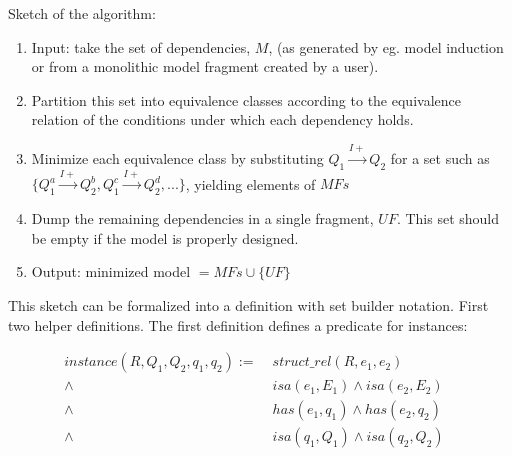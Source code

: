 \documentclass{article} %
\begin{document}
%
%

Sketch of the algorithm:

\begin{enumerate}

\item Input: take the set of dependencies, $M$, (as generated by eg. model
	induction or from a monolithic model fragment created by a user).  

\item Partition this set into equivalence classes according to the
	equivalence relation of the conditions under which each dependency
	holds.

\item Minimize each equivalence class by substituting 
	$Q_1 \overset{I+}{\rightarrow} Q_2 $ for a set such as 
	$ \{ Q_1^a \overset{I+}{\rightarrow} Q_2^b, Q_1^c \overset{I+}{\rightarrow} Q_2^d,  . . . \} $, 
	yielding elements of $MFs$

\item Dump the remaining dependencies in a single fragment, $UF$. 
	This set should be empty if the model is properly designed.

\item Output: minimized model $ = MFs \cup \{ UF \} $

\end{enumerate}

This sketch can be formalized into a definition with set builder notation.
First two helper definitions. The first definition defines a predicate for
instances:

\begin{align*}
instance(R, Q_1, Q_2, q_1, q_2) :=
	\; &struct\_rel(R, e_1, e_2) & \\
	\land \; &isa(e_1, E_1) \land isa(e_2, E_2) \\
	\land \; &has(e_1, q_1) \land has(e_2, q_2)  \\
	\land \; &isa(q_1, Q_1) \land isa(q_2, Q_2) \\
\end{align*}
\end{document}
